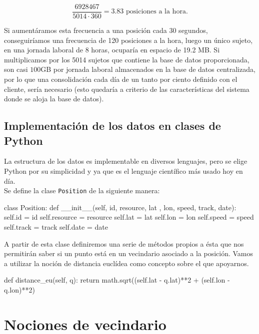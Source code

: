 \documentclass[a4paper, 12pt]{article}
\begin{document}
$$ \frac{6928467}{5014 \cdot 360} = 3.83 \text{ posiciones a la hora.}$$ 

Si aument\'aramos esta frecuencia a una posici\'on cada 30 segundos, conseguir\'iamos una frecuencia de 120 posiciones a la hora, luego un \'unico sujeto, en una jornada laboral de 8 horas, ocupar\'ia en espacio de 19.2 MB. Si multiplicamos por los 5014 sujetos que contiene la base de datos proporcionada, son casi $100$GB por jornada laboral almacenados en la base de datos centralizada, por lo que una consolidaci\'on cada d\'ia de un tanto por ciento definido con el cliente, ser\'ia necesario (esto quedar\'ia a criterio de las caracter\'isticas del sistema donde se aloja la base de datos).

\subsection{Implementaci\'on de los datos en clases de Python}\label{sec:positionClass}

La estructura de los datos es implementable en diversos lenguajes, pero se elige Python por su simplicidad y ya que es el lenguaje cient\'ifico m\'as usado hoy en d\'ia.\\

Se define la clase \texttt{Position} de la siguiente manera:\\

\begin{python}
class Position:
    def __init__(self, id, resource, lat
    		    , lon, speed, track, date):
        self.id = id
        self.resource = resource
        self.lat = lat
        self.lon = lon
        self.speed = speed
        self.track = track
        self.date = date
\end{python}

\bigskip

A partir de esta clase definiremos una serie de m\'etodos propios a \'esta que nos permitir\'an saber si un punto est\'a en un vecindario asociado a la posici\'on. Vamos a utilizar la noci\'on de distancia eucl\'idea como concepto sobre el que apoyarnos.\\

\begin{python}
        def distance_eu(self, q):
                return math.sqrt((self.lat - q.lat)**2 
                	+ (self.lon - q.lon)**2)
\end{python}


\pagebreak
\section{Nociones de vecindario}
\end{document}
